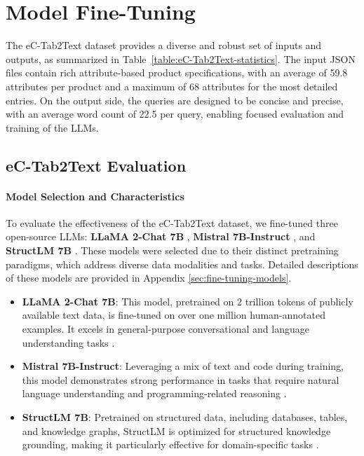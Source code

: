 \section{Model Fine-Tuning}

The eC-Tab2Text dataset provides a diverse and robust set of inputs and outputs, as summarized in Table~\ref{table:eC-Tab2Text-statistics}. The input JSON files contain rich attribute-based product specifications, with an average of 59.8 attributes per product and a maximum of 68 attributes for the most detailed entries. On the output side, the queries are designed to be concise and precise, with an average word count of 22.5 per query, enabling focused evaluation and training of the LLMs.

\subsection{eC-Tab2Text Evaluation} 
\label{sec:evaluation}

\paragraph{Model Selection and Characteristics} To evaluate the effectiveness of the eC-Tab2Text dataset, we fine-tuned three open-source LLMs: \textbf{LLaMA 2-Chat 7B} \cite{touvron2023llama}, \textbf{Mistral 7B-Instruct} \cite{jiang2023mistral}, and \textbf{StructLM 7B} \cite{zhuang2024structlm}. These models were selected due to their distinct pretraining paradigms, which address diverse data modalities and tasks. Detailed descriptions of these models are provided in Appendix \ref{sec:fine-tuning-models}.

\begin{itemize}
    \item \textbf{LLaMA 2-Chat 7B}: This model, pretrained on 2 trillion tokens of publicly available text data, is fine-tuned on over one million human-annotated examples. It excels in general-purpose conversational and language understanding tasks \cite{touvron2023llama}.
    \item \textbf{Mistral 7B-Instruct}: Leveraging a mix of text and code during training, this model demonstrates strong performance in tasks that require natural language understanding and programming-related reasoning \cite{jiang2023mistral}.
    \item \textbf{StructLM 7B}: Pretrained on structured data, including databases, tables, and knowledge graphs, StructLM is optimized for structured knowledge grounding, making it particularly effective for domain-specific tasks \cite{zhuang2024structlm}.
\end{itemize}

